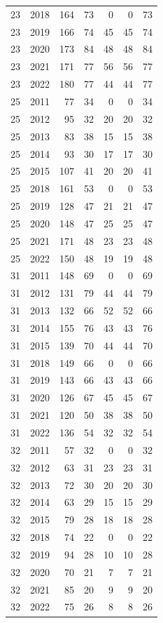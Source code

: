 \begin{longtable}{llrrrrr}
23 & 2018 & 164 & 73 & 0 & 0 & 73 \\
23 & 2019 & 166 & 74 & 45 & 45 & 74 \\
23 & 2020 & 173 & 84 & 48 & 48 & 84 \\
23 & 2021 & 171 & 77 & 56 & 56 & 77 \\
23 & 2022 & 180 & 77 & 44 & 44 & 77 \\
25 & 2011 & 77 & 34 & 0 & 0 & 34 \\
25 & 2012 & 95 & 32 & 20 & 20 & 32 \\
25 & 2013 & 83 & 38 & 15 & 15 & 38 \\
25 & 2014 & 93 & 30 & 17 & 17 & 30 \\
25 & 2015 & 107 & 41 & 20 & 20 & 41 \\
25 & 2018 & 161 & 53 & 0 & 0 & 53 \\
25 & 2019 & 128 & 47 & 21 & 21 & 47 \\
25 & 2020 & 148 & 47 & 25 & 25 & 47 \\
25 & 2021 & 171 & 48 & 23 & 23 & 48 \\
25 & 2022 & 150 & 48 & 19 & 19 & 48 \\
31 & 2011 & 148 & 69 & 0 & 0 & 69 \\
31 & 2012 & 131 & 79 & 44 & 44 & 79 \\
31 & 2013 & 132 & 66 & 52 & 52 & 66 \\
31 & 2014 & 155 & 76 & 43 & 43 & 76 \\
31 & 2015 & 139 & 70 & 44 & 44 & 70 \\
31 & 2018 & 149 & 66 & 0 & 0 & 66 \\
31 & 2019 & 143 & 66 & 43 & 43 & 66 \\
31 & 2020 & 126 & 67 & 45 & 45 & 67 \\
31 & 2021 & 120 & 50 & 38 & 38 & 50 \\
31 & 2022 & 136 & 54 & 32 & 32 & 54 \\
32 & 2011 & 57 & 32 & 0 & 0 & 32 \\
32 & 2012 & 63 & 31 & 23 & 23 & 31 \\
32 & 2013 & 72 & 30 & 20 & 20 & 30 \\
32 & 2014 & 63 & 29 & 15 & 15 & 29 \\
32 & 2015 & 79 & 28 & 18 & 18 & 28 \\
32 & 2018 & 74 & 22 & 0 & 0 & 22 \\
32 & 2019 & 94 & 28 & 10 & 10 & 28 \\
32 & 2020 & 70 & 21 & 7 & 7 & 21 \\
32 & 2021 & 85 & 20 & 9 & 9 & 20 \\
32 & 2022 & 75 & 26 & 8 & 8 & 26 \\
\end{longtable}
